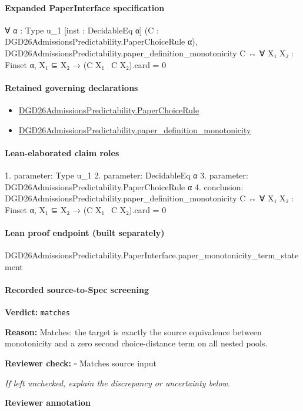 \documentclass[10pt]{article}
\newcommand{\reviewerbox}{%
  \par\noindent\fbox{\parbox{0.96\linewidth}{\rule{0pt}{0.38in}}}\par
}
\newcommand{\reviewmatch}[1]{%
  \par\noindent\textbf{Reviewer check:} $\square$\; #1\par
  \noindent\emph{If left unchecked, explain the discrepancy or uncertainty below.}\par
}
\begin{document}
\paragraph{Expanded PaperInterface specification}
\begin{ReviewVerbatim}
∀ {α : Type u_1} [inst : DecidableEq α] (C : DGD26AdmissionsPredictability.PaperChoiceRule α),
  DGD26AdmissionsPredictability.paper_definition_monotonicity C ↔ ∀ {X₁ X₂ : Finset α}, X₁ ⊆ X₂ → (C X₁ \ C X₂).card = 0
\end{ReviewVerbatim}

\paragraph{Retained governing declarations}
\begin{itemize}\raggedright
\item \hyperlink{governing-declaration-4678951b4432b184}{DGD26\allowbreak{}Admissions\allowbreak{}Predictability.\allowbreak{}Paper\allowbreak{}Choice\allowbreak{}Rule}
\item \hyperlink{governing-declaration-bac62f3daf5d4d98}{DGD26\allowbreak{}Admissions\allowbreak{}Predictability.\allowbreak{}paper\_\allowbreak{}definition\_\allowbreak{}monotonicity}
\end{itemize}
\paragraph{Lean-elaborated claim roles}\begin{ReviewVerbatim}
1. parameter: Type u_1
2. parameter: DecidableEq α
3. parameter: DGD26AdmissionsPredictability.PaperChoiceRule α
4. conclusion: DGD26AdmissionsPredictability.paper_definition_monotonicity C ↔ ∀ {X₁ X₂ : Finset α}, X₁ ⊆ X₂ → (C X₁ \ C X₂).card = 0
\end{ReviewVerbatim}

\paragraph{Lean proof endpoint (built separately)}\begin{ReviewVerbatim}
DGD26AdmissionsPredictability.PaperInterface.paper_monotonicity_term_statement
\end{ReviewVerbatim}

\paragraph{Recorded source-to-Spec screening}
\textbf{Verdict:} \texttt{matches}
\\
{\raggedright
\textbf{Reason:} Matches:\allowbreak{} the target is exactly the source equivalence between monotonicity and a zero second choice-\allowbreak{}distance term on all nested pools.\allowbreak{}
\par}
\reviewmatch{Matches source input}
\noindent\textbf{Reviewer annotation}\par
\reviewerbox
\clearpage
\hypertarget{source-claim-43c4c9b7821d369a}{}
\end{document}
